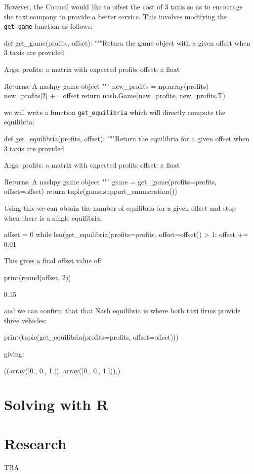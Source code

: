 However, the Council would like to offset the cost of 3
taxis so as to encourage the taxi company to provide a better service. This
involves modifying the \texttt{get_game} function as follows:

\begin{pyin}
def get_game(profits, offset):
    """Return the game object with a given offset
    when 3 taxis are provided

    Args:
        profits: a matrix with expected profits
        offset: a float

    Returns:
        A nashpy game object
    """
    new_profits = np.array(profits)
    new_profits[2] += offset
    return nash.Game(new_profits, new_profits.T)
\end{pyin}

we will write a function \texttt{get_equilibria} which will directly
compute the equilibria:

\begin{pyin}
def get_equilibria(profits, offset):
    """Return the equilibria for a given offset
    when 3 taxis are provided

    Args:
        profits: a matrix with expected profits
        offset: a float

    Returns:
        A nashpy game object
    """
    game = get_game(profits=profits, offset=offset)
    return tuple(game.support_enumeration())
\end{pyin}


Using this we can obtain the number of equilibria for a given offset and stop
when there is a single equilibria:

\begin{pyin}
offset = 0
while len(get_equilibria(profits=profits, offset=offset)) > 1:
    offset += 0.01
\end{pyin}

This gives a final offset value of:

\begin{pyin}
print(round(offset, 2))
\end{pyin}


\begin{pyout}
0.15
\end{pyout}

and we can confirm that that Nash equilibria is where both taxi firms provide
three vehicles:

\begin{pyin}
print(tuple(get_equilibria(profits=profits, offset=offset)))
\end{pyin}

giving:

\begin{pyout}
((array([0., 0., 1.]), array([0., 0., 1.])),)
\end{pyout}

\section{Solving with R}\label{sec:solving-with-R}
\section{Research}\label{sec:research}

TBA
